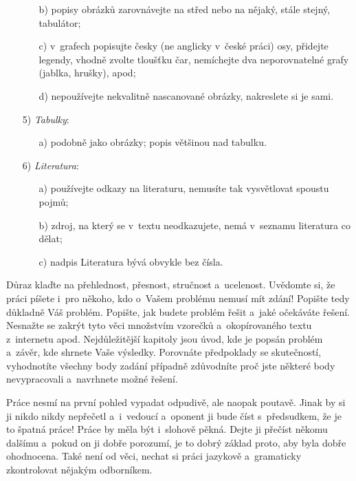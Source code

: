 \begin{enumerate}
\begin{enumerate}
        \item[b)] popisy obrázků zarovnávejte na střed nebo na nějaký, stále stejný, tabulátor;
        \item[c)] v~grafech popisujte česky (ne anglicky v~české práci) osy, přidejte legendy, vhodně zvolte tloušťku čar, nemíchejte dva neporovnatelné grafy (jablka, hruš\-ky), apod;
        \item[d)] nepoužívejte nekvalitně nascanované obrázky, nakreslete si je sami.
    \end{enumerate}
    \item[5)] \emph{Tabulky}:
    \begin{enumerate}
        \item[a)] podobně jako obrázky; popis většinou nad tabulku.
    \end{enumerate}
    \item[6)] \emph{Literatura}:
    \begin{enumerate}
        \item[a)] používejte odkazy na literaturu, nemusíte tak vysvětlovat spoustu pojmů;
        \item[b)] zdroj, na který se v~textu neodkazujete, nemá v~seznamu literatura co dělat;
        \item[c)] nadpis Literatura bývá obvykle bez čísla.
    \end{enumerate}
\end{enumerate}


Důraz klaďte na přehlednost, přesnost, stručnost a~ucelenost. Uvědomte si, že práci píšete i~pro někoho, kdo o~Vašem problému nemusí mít zdání! Popište tedy důkladně Váš problém. Popište, jak budete problém řešit a~jaké očekáváte řešení. Nesnažte se zakrýt tyto věci množstvím vzorečků a~okopírovaného textu z~internetu apod. Nejdůležitější kapitoly jsou úvod, kde je popsán problém a~závěr, kde shrnete Vaše výsledky. Porovnáte předpoklady se skutečností, vyhodnotíte všechny body zadání případně zdůvodníte proč jste některé body nevypracovali a~navrhnete možné řešení.

Práce nesmí na první pohled vypadat odpudivě, ale naopak poutavě. Jinak by si ji ni\-kdo nikdy nepřečetl a~i~vedoucí a~oponent ji bude číst s~předsudkem, že je to špatná práce! Práce by měla být i~slohově pěkná. Dejte ji přečíst někomu dalšímu a~pokud on ji dobře porozumí, je to dobrý základ proto, aby byla dobře ohodnocena. Také není od věci, nechat si práci jazykově a~gramaticky zkontrolovat nějakým odborníkem.



